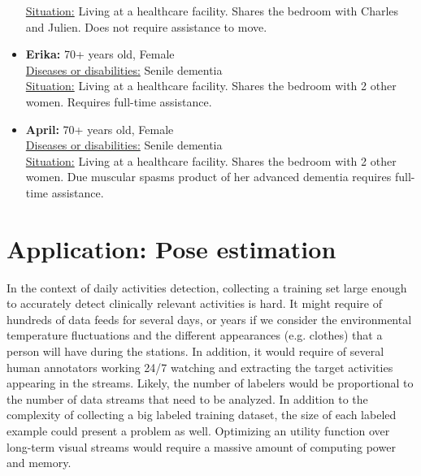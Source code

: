 \documentclass[oneside, twocolumn]{article}
\begin{document}
\begin{itemize}
			\underline{Situation:} Living at a healthcare facility. Shares the bedroom with Charles and Julien. Does not require assistance to move.\\
	\item \textbf{Erika:} 70+ years old, Female \\
			\underline{Diseases or disabilities:} Senile dementia \\
			\underline{Situation:} Living at a healthcare facility. Shares the bedroom with 2 other women. Requires full-time assistance.\\
	\item \textbf{April:} 70+ years old, Female \\
			\underline{Diseases or disabilities:} Senile dementia \\
			\underline{Situation:} Living at a healthcare facility. Shares the bedroom with 2 other women. Due muscular spasms product of her advanced dementia requires full-time assistance. \\
  \fi
\end{itemize}


\section{Application: Pose estimation}
\label{sec:application}

In the context of daily activities detection, collecting a training set large enough to accurately detect
clinically relevant activities is hard. It might require of hundreds of data feeds for several days, or years if
we consider the environmental temperature fluctuations and the different appearances (e.g. clothes) that a person
will have during the stations. In addition, it would require of several human annotators working 24/7 watching and
extracting the target activities appearing in the streams. Likely, the number of labelers would be proportional to
the number of data streams that need to be analyzed. In addition to the complexity of collecting a big labeled
training dataset, the size of each labeled example could present a problem as well. Optimizing an utility function
over long-term visual streams would require a massive amount of computing power and memory.
\end{document}
